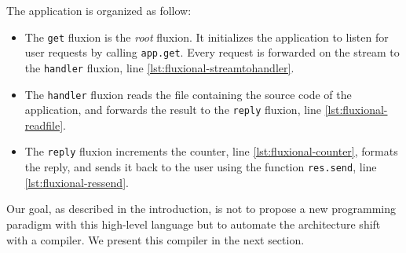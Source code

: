 The application is organized as follow:
\begin{itemize}
  \item The \texttt{get} fluxion is the \textit{root} fluxion.
  It initializes the application to listen for user requests by calling \texttt{app.get}.
  Every request is forwarded on the stream to the \texttt{handler} fluxion, line \ref{lst:fluxional-streamtohandler}.
  \item The \texttt{handler} fluxion reads the file containing the source code of the application, and forwards the result to the \texttt{reply} fluxion, line \ref{lst:fluxional-readfile}.
  \item The \texttt{reply} fluxion increments the counter, line \ref{lst:fluxional-counter}, formats the reply, and sends it back to the user using the function \texttt{res.send}, line \ref{lst:fluxional-ressend}.
\end{itemize}

Our goal, as described in the introduction, is not to propose a new programming paradigm with this high-level language but to automate the architecture shift with a compiler.
We present this compiler in the next section.